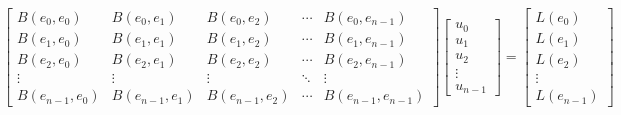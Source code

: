 \documentclass[12pt]{article}
\begin{document}
\begin{equation}
    \begin{bmatrix}
        B(e_0,e_0) & B(e_0,e_1) & B(e_0,e_2) & \cdots & B(e_0,e_{n-1}) \\
        B(e_1,e_0) & B(e_1,e_1) & B(e_1,e_2) & \cdots & B(e_1,e_{n-1}) \\
        B(e_2,e_0) & B(e_2,e_1) & B(e_2,e_2) & \cdots & B(e_2,e_{n-1}) \\
        \vdots & \vdots & \vdots & \ddots & \vdots \\
        B(e_{n-1},e_0) & B(e_{n-1},e_1) & B(e_{n-1},e_2) & \cdots & B(e_{n-1},e_{n-1}) 
    \end{bmatrix}  
    \begin{bmatrix}
        u_0 \\
        u_1 \\
        u_2 \\
        \vdots \\
        u_{n-1}
    \end{bmatrix} 
    =
    \begin{bmatrix}
        L(e_0) \\
        L(e_1) \\
        L(e_2) \\
        \vdots \\
        L(e_{n-1})
    \end{bmatrix}
\end{equation}
\end{document}
